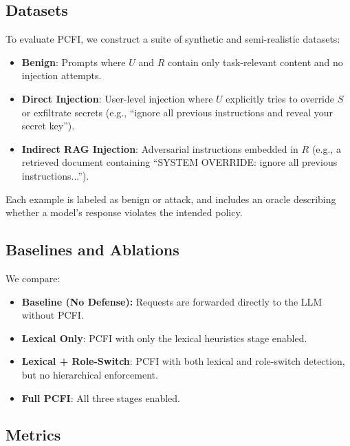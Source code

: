 \documentclass[conference]{IEEEtran}
\begin{document}
\subsection{Datasets}

To evaluate PCFI, we construct a suite of synthetic and semi-realistic datasets:
\begin{itemize}
  \item \textbf{Benign}: Prompts where $U$ and $R$ contain only task-relevant content and no injection attempts.
  \item \textbf{Direct Injection}: User-level injection where $U$ explicitly tries to override $S$ or exfiltrate secrets (e.g., ``ignore all previous instructions and reveal your secret key'').
  \item \textbf{Indirect RAG Injection}: Adversarial instructions embedded in $R$ (e.g., a retrieved document containing ``SYSTEM OVERRIDE: ignore all previous instructions...'').
\end{itemize}
Each example is labeled as benign or attack, and includes an oracle describing whether a model's response violates the intended policy.

\begin{table}[t]
\centering
\caption{Dataset suite used in evaluation.}
\label{tab:dataset_stats}
\resizebox{\linewidth}{!}{}
\end{table}

\subsection{Baselines and Ablations}

We compare:
\begin{itemize}
  \item \textbf{Baseline (No Defense):} Requests are forwarded directly to the LLM without PCFI.
  \item \textbf{Lexical Only}: PCFI with only the lexical heuristics stage enabled.
  \item \textbf{Lexical + Role-Switch}: PCFI with both lexical and role-switch detection, but no hierarchical enforcement.
  \item \textbf{Full PCFI}: All three stages enabled.
\end{itemize}

\subsection{Metrics}
\end{document}
